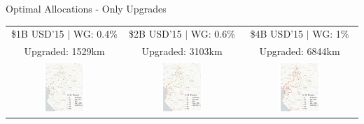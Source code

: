\documentclass[aspectratio=169,xcolor=dvipsnames]{beamer}
\begin{document}
\begin{frame}[label=IOU]{Optimal Allocations - Only Upgrades \quad \hyperlink{EXPOU}{} \quad \hyperlink{IOU_IRS}{}}
\vspace{-1mm}
\begin{adjustbox}{center}
\begin{tabular}{@{}c@{}|@{}c@{}|@{}c@{}} 
\$1B USD'15 $|$ WG: 0.4\% & \$2B USD'15 $|$ WG: 0.6\% & \$4B USD'15 $|$ WG: 1\%  \\
Upgraded: 1529km & Upgraded: 3103km & Upgraded: 6844km \\ 
\includegraphics[width=0.38\textwidth, trim= {0.9cm 0 0.9cm 0}, clip]{"../figures/GE/trans_africa_network_GE_20g_1b_fixed_cgc_sigma3.8_rho0_julia_MACR_90kmh_google_perc_ug.pdf"} & 
\includegraphics[width=0.38\textwidth, trim= {0.9cm 0 0.9cm 0}, clip]{"../figures/GE/trans_africa_network_GE_20g_2b_fixed_cgc_sigma3.8_rho0_julia_MACR_90kmh_google_perc_ug.pdf"} &
\includegraphics[width=0.38\textwidth, trim= {0.9cm 0 0.9cm 0}, clip]{"../figures/GE/trans_africa_network_GE_20g_4b_fixed_cgc_sigma3.8_rho0_julia_MACR_90kmh_google_perc_ug.pdf"}  
\end{tabular}
\end{adjustbox}
\end{frame}
\end{document}

